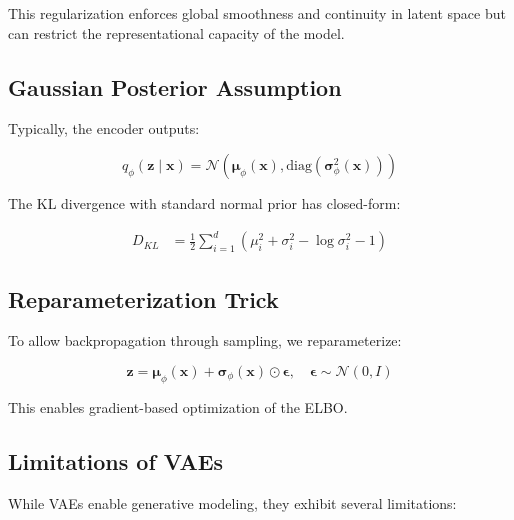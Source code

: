 This regularization enforces global smoothness and continuity in latent space but can restrict the representational capacity of the model.

\subsection{Gaussian Posterior Assumption}

Typically, the encoder outputs:

\begin{equation}
q_\phi(\mathbf{z} \mid \mathbf{x}) =
\mathcal{N}\left(\boldsymbol{\mu}_\phi(\mathbf{x}),
\mathrm{diag}(\boldsymbol{\sigma}_\phi^2(\mathbf{x}))\right)
\end{equation}

The KL divergence with standard normal prior has closed-form:

\begin{align}
D_{KL} &= \frac{1}{2}
\sum_{i=1}^{d}
\left(
\mu_i^2 + \sigma_i^2 - \log \sigma_i^2 - 1
\right)
\end{align}

\subsection{Reparameterization Trick}

To allow backpropagation through sampling, we reparameterize:

\begin{equation}
\mathbf{z} =
\boldsymbol{\mu}_\phi(\mathbf{x}) +
\boldsymbol{\sigma}_\phi(\mathbf{x}) \odot \boldsymbol{\epsilon},
\quad
\boldsymbol{\epsilon} \sim \mathcal{N}(0, I)
\end{equation}

This enables gradient-based optimization of the ELBO.

\subsection{Limitations of VAEs}

While VAEs enable generative modeling, they exhibit several limitations:

